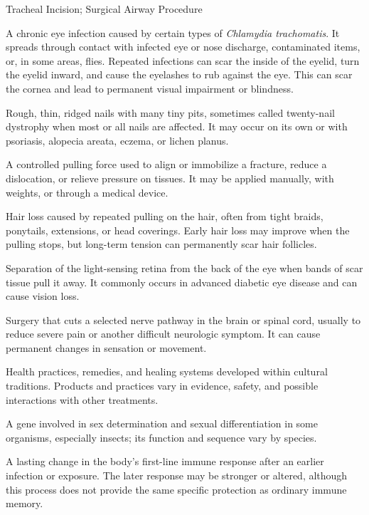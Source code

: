 \synonyms
Tracheal Incision; Surgical Airway Procedure

 A chronic eye infection caused by certain types of \textit{Chlamydia trachomatis}. It spreads through contact with infected eye or nose discharge, contaminated items, or, in some areas, flies. Repeated infections can scar the inside of the eyelid, turn the eyelid inward, and cause the eyelashes to rub against the eye. This can scar the cornea and lead to permanent visual impairment or blindness.

 Rough, thin, ridged nails with many tiny pits, sometimes called twenty-nail dystrophy when most or all nails are affected. It may occur on its own or with psoriasis, alopecia areata, eczema, or lichen planus.

 A controlled pulling force used to align or immobilize a fracture, reduce a dislocation, or relieve pressure on tissues. It may be applied manually, with weights, or through a medical device.

 Hair loss caused by repeated pulling on the hair, often from tight braids, ponytails, extensions, or head coverings. Early hair loss may improve when the pulling stops, but long-term tension can permanently scar hair follicles.

 Separation of the light-sensing retina from the back of the eye when bands of scar tissue pull it away. It commonly occurs in advanced diabetic eye disease and can cause vision loss.

 Surgery that cuts a selected nerve pathway in the brain or spinal cord, usually to reduce severe pain or another difficult neurologic symptom. It can cause permanent changes in sensation or movement.

 Health practices, remedies, and healing systems developed within cultural traditions. Products and practices vary in evidence, safety, and possible interactions with other treatments.

 A gene involved in sex determination and sexual differentiation in some organisms, especially insects; its function and sequence vary by species.

 A lasting change in the body’s first-line immune response after an earlier infection or exposure. The later response may be stronger or altered, although this process does not provide the same specific protection as ordinary immune memory.


